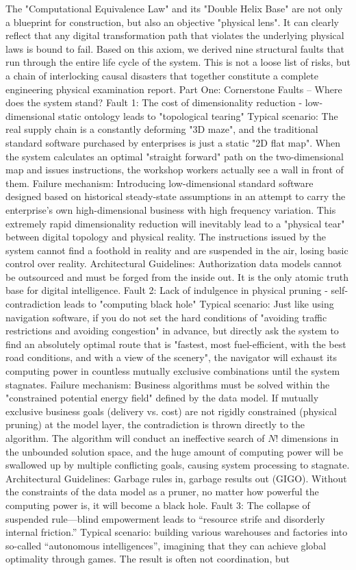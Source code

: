 \documentclass[11pt,a4paper]{article}
\begin{document}
The "Computational Equivalence Law" and its "Double Helix Base" are not only a blueprint for construction, but also an objective "physical lens". It can clearly reflect that any digital transformation path that violates the underlying physical laws is bound to fail. Based on this axiom, we derived nine structural faults that run through the entire life cycle of the system. This is not a loose list of risks, but a chain of interlocking causal disasters that together constitute a complete engineering physical examination report. Part One: Cornerstone Faults – Where does the system stand? Fault 1: The cost of dimensionality reduction - low-dimensional static ontology leads to "topological tearing" Typical scenario: The real supply chain is a constantly deforming "3D maze", and the traditional standard software purchased by enterprises is just a static "2D flat map". When the system calculates an optimal "straight forward" path on the two-dimensional map and issues instructions, the workshop workers actually see a wall in front of them. Failure mechanism: Introducing low-dimensional standard software designed based on historical steady-state assumptions in an attempt to carry the enterprise's own high-dimensional business with high frequency variation. This extremely rapid dimensionality reduction will inevitably lead to a "physical tear" between digital topology and physical reality. The instructions issued by the system cannot find a foothold in reality and are suspended in the air, losing basic control over reality. Architectural Guidelines: Authorization data models cannot be outsourced and must be forged from the inside out. It is the only atomic truth base for digital intelligence. Fault 2: Lack of indulgence in physical pruning - self-contradiction leads to "computing black hole" Typical scenario: Just like using navigation software, if you do not set the hard conditions of "avoiding traffic restrictions and avoiding congestion" in advance, but directly ask the system to find an absolutely optimal route that is "fastest, most fuel-efficient, with the best road conditions, and with a view of the scenery", the navigator will exhaust its computing power in countless mutually exclusive combinations until the system stagnates. Failure mechanism: Business algorithms must be solved within the "constrained potential energy field" defined by the data model. If mutually exclusive business goals (delivery vs. cost) are not rigidly constrained (physical pruning) at the model layer, the contradiction is thrown directly to the algorithm. The algorithm will conduct an ineffective search of $N!$ dimensions in the unbounded solution space, and the huge amount of computing power will be swallowed up by multiple conflicting goals, causing system processing to stagnate. Architectural Guidelines: Garbage rules in, garbage results out (GIGO). Without the constraints of the data model as a pruner, no matter how powerful the computing power is, it will become a black hole. Fault 3: The collapse of suspended rule—blind empowerment leads to “resource strife and disorderly internal friction.” Typical scenario: building various warehouses and factories into so-called “autonomous intelligences”, imagining that they can achieve global optimality through games. The result is often not coordination, but 
\end{document}
